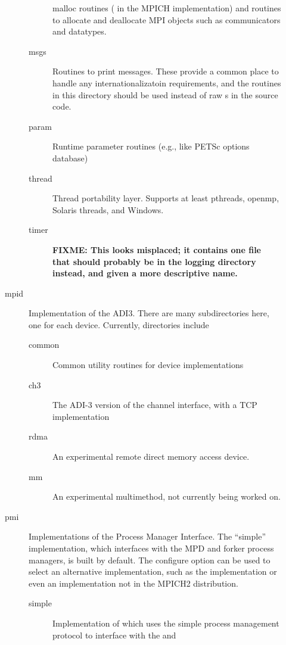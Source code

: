 \documentclass{article}
\def\fixme#1{\marginpar{FIXME:}\textbf{FIXME: #1}}
\begin{document}
\begin{description}
\begin{description}
\begin{description}
      malloc routines ( in the MPICH implementation) and
    routines to allocate and deallocate MPI objects such as
    communicators and datatypes.
    \item[msgs]Routines to print messages.  These provide a common
    place to handle any internationalizatoin requirements, and the
    routines in this directory should be used instead of raw
    s in the source code.
    \item[param]Runtime parameter routines (e.g., like PETSc options database)
    \item[thread]Thread portability layer.  Supports at least pthreads,
      openmp, Solaris threads, and Windows.
    \item[timer]\fixme{This looks misplaced; it contains one file that
      should probably be in the logging directory instead, and given a
      more descriptive name.}
    \end{description}
  \item[mpid]Implementation of the ADI3.  There are many
    subdirectories here, one for each device.  Currently, directories include
    \begin{description}
    \item[common]Common utility routines for device implementations
    \item[ch3]The ADI-3 version of the channel interface, with a TCP
    implementation
    \item[rdma]An experimental remote direct memory access device.
    \item[mm]An experimental multimethod, not currently being worked on.
    \end{description}
  \item[pmi]Implementations of the Process Manager Interface.  The ``simple''
    implementation, which interfaces with the MPD and forker process managers,
    is built by default.   The configure option  can
    be used to select an alternative implementation, such as the 
    implementation or even
    an implementation not in the MPICH2 distribution.
    \begin{description}
          \item[simple]Implementation of  which uses the simple
            process management protocol to interface with the  and

\end{description}
\end{description}
\end{description}
\end{document}
